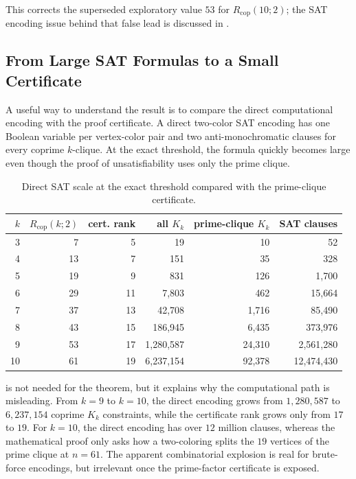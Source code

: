 \documentclass[11pt]{article}
\theoremstyle{plain}
\theoremstyle{definition}
\theoremstyle{remark}
\newcommand{\Rcop}{R_{\mathrm{cop}}}
\begin{document}
This corrects the superseded exploratory value $53$ for $\Rcop(10;2)$; the SAT
encoding issue behind that false lead is discussed in .

\subsection{From Large SAT Formulas to a Small Certificate}

A useful way to understand the result is to compare the direct computational
encoding with the proof certificate.  A direct two-color SAT encoding has one
Boolean variable per vertex-color pair and two anti-monochromatic clauses for
every coprime $k$-clique.  At the exact threshold, the formula quickly becomes
large even though the proof of unsatisfiability uses only the prime clique.

\begin{table}[htbp]
\centering
\caption{Direct SAT scale at the exact threshold compared with the prime-clique certificate.}
\label{tab:structural-diagnostics}
\small
\begin{tabular}{rrrrrr}
\toprule
$k$ & $R_{\mathrm{cop}}(k;2)$ & cert. rank & all $K_k$ & prime-clique $K_k$ & SAT clauses \\
\midrule
3 & 7 & 5 & 19 & 10 & 52 \\
4 & 13 & 7 & 151 & 35 & 328 \\
5 & 19 & 9 & 831 & 126 & 1,700 \\
6 & 29 & 11 & 7,803 & 462 & 15,664 \\
7 & 37 & 13 & 42,708 & 1,716 & 85,490 \\
8 & 43 & 15 & 186,945 & 6,435 & 373,976 \\
9 & 53 & 17 & 1,280,587 & 24,310 & 2,561,280 \\
10 & 61 & 19 & 6,237,154 & 92,378 & 12,474,430 \\
\bottomrule
\end{tabular}

\end{table}

 is not needed for the theorem, but it
explains why the computational path is misleading.  From $k=9$ to $k=10$,
the direct encoding grows from $1{,}280{,}587$ to $6{,}237{,}154$ coprime
$K_k$ constraints, while the certificate rank grows only from $17$ to $19$.
For $k=10$, the direct encoding has over $12$ million clauses, whereas the
mathematical proof only asks how a two-coloring splits the $19$ vertices of
the prime clique at $n=61$.  The apparent combinatorial explosion is real for
brute-force encodings, but irrelevant once the prime-factor certificate is
exposed.
\end{document}
